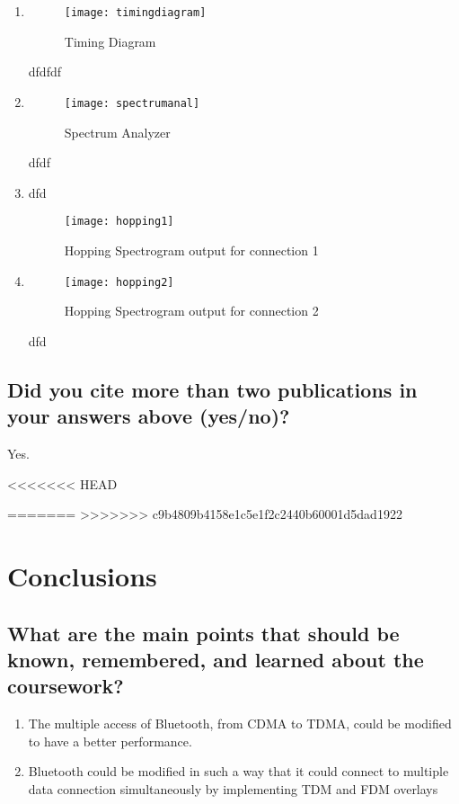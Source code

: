\begin{enumerate}		
	\item
		\begin{figure}[ht]
			\centering
			\captionsetup{justification=centering,margin=2cm}
			\texttt{[image: timingdiagram]}
			\caption{Timing Diagram}
		\end{figure}
	dfdfdf
	\item
	\begin{figure}[ht]
	\centering
	\captionsetup{justification=centering,margin=2cm}
	\texttt{[image: spectrumanal]}
	\caption{Spectrum Analyzer}
	\end{figure}
dfdf
	\item 
dfd
	\begin{figure}[ht]
	\centering
	\captionsetup{justification=centering,margin=2cm}
	\texttt{[image: hopping1]}
	\caption{Hopping Spectrogram output for connection 1}
	\end{figure}

	\item 
	\begin{figure}[ht]
	\centering
	\captionsetup{justification=centering,margin=2cm}
	\texttt{[image: hopping2]}
	\caption{Hopping Spectrogram output for connection 2}
	\end{figure}
dfd
\end{enumerate}

\subsection{Did you cite more than two publications in your answers above (yes/no)?}
Yes.	

<<<<<<< HEAD


=======
>>>>>>> c9b4809b4158e1c5e1f2c2440b60001d5dad1922
\section{Conclusions}
\label{sec:conc}

\subsection{What are the main points that should be known, remembered, and learned about the coursework?}
\begin{enumerate}
	\item The multiple access of Bluetooth, from CDMA to TDMA, could be modified to have a better performance.
	\item Bluetooth could be modified in such a way that it could connect to multiple data connection simultaneously by implementing TDM and FDM overlays
\end{enumerate}

